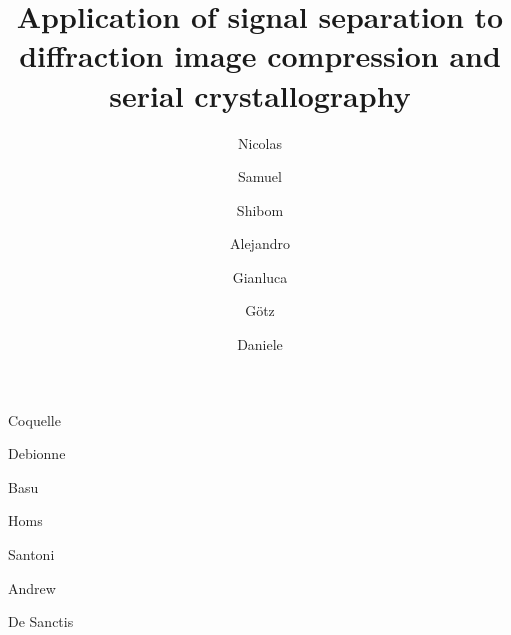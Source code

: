 \documentclass[preprint]{iucr}              %
\begin{document}



\title{Application of signal separation to diffraction image compression and serial crystallography}


\author[a]{Nicolas}{Coquelle}
\author[a]{Samuel}{Debionne}
\author[b]{Shibom}{Basu}
\author[a]{Alejandro}{Homs}
\author[a]{Gianluca}{Santoni}
\author[a]{Götz}{Andrew}
\author[a]{Daniele}{De Sanctis}








\end{document}
